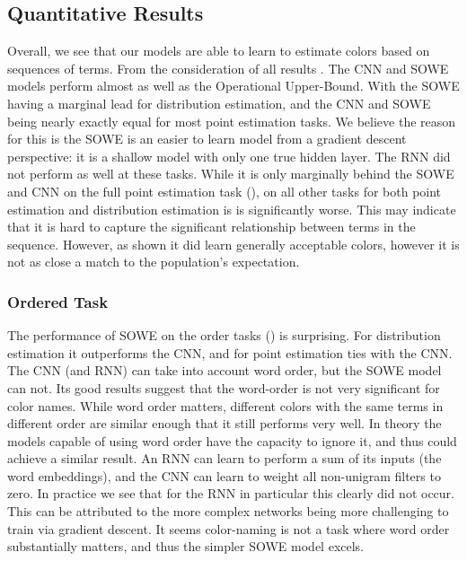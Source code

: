 \documentclass[11pt,a4paper]{article}
\begin{document}
\subsection{Quantitative Results}\label{sec:quantitative-results}

Overall, we see that our models are able to learn to estimate colors based on sequences of terms.
From the consideration of all results .
The CNN and SOWE models perform almost as well as the Operational Upper-Bound.
With the SOWE having a marginal lead for distribution estimation,
and the CNN and SOWE being nearly exactly equal for most point estimation tasks.
We believe the reason for this is the SOWE is an easier to learn model from a gradient descent perspective:
it is a shallow model with only one true hidden layer.
The RNN did not perform as well at these tasks.
While it is only marginally behind the SOWE and CNN on the full point estimation task (), on all other tasks for both point estimation and distribution estimation is is significantly worse.
This may indicate that it is hard to capture the significant relationship between terms in the sequence.
However, as shown  it did learn generally acceptable colors, however it is not as close a match to the population's expectation.

\subsubsection{Ordered Task}
The performance of SOWE on the order tasks () is surprising.
For distribution estimation it outperforms the CNN, and for point estimation ties with the CNN.
The CNN (and RNN) can take into account word order, but the SOWE model can not.
Its good results suggest that the word-order is not very significant for color names.
While word order matters, different colors with the same terms in different order are similar enough that it still performs very well.
In theory the models capable of using word order have the capacity to ignore it, and thus could achieve a similar result.
An RNN can learn to perform a sum of its inputs (the word embeddings),
and the CNN can learn to weight all non-unigram filters to zero.
In practice we see that for the RNN in particular this clearly did not occur.
This can be attributed to the more complex networks being more challenging to train via gradient descent.
It seems color-naming is not a task where word order substantially matters,
and thus the simpler SOWE model excels.
\end{document}
